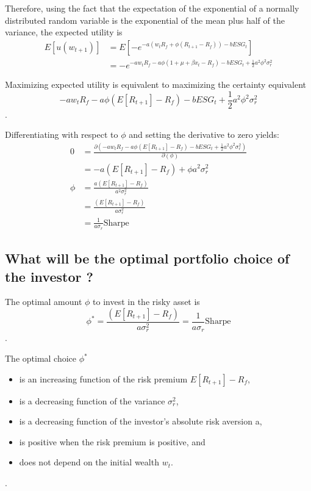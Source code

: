 \documentclass[]{article}
\begin{document}
Therefore, using the fact that the expectation of the exponential of a normally distributed random variable is the exponential of the mean plus half of the variance, the expected utility is
\begin{align*}
	E[u(w_{t+1})] &= E[-e^{-a(w_t R_f + \phi (R_{t+1} - R_f)) - bESG_t}]\\
	&= -e^{-aw_t R_f -a \phi (1+\mu+\beta x_t - R_f) - bESG_t + \frac{1}{2}a^2 \phi^2 \sigma_r^2}
\end{align*}

Maximizing expected utility is equivalent to maximizing the certainty equivalent $$-aw_t R_f -a \phi (E[R_{t+1}] - R_f) - bESG_t + \frac{1}{2}a^2 \phi^2 \sigma_r^2$$.

Differentiating with respect to $\phi$ and setting the derivative to zero yields: 
\begin{align*}
	0 &= \frac{\partial (-aw_t R_f -a \phi (E[R_{t+1}] - R_f) - bESG_t + \frac{1}{2}a^2 \phi^2 \sigma_r^2)}{\partial(\phi)}\\
	&= -a (E[R_{t+1}] - R_f) + \phi a^2 \sigma_r^2\\
	\phi &= \frac{a (E[R_{t+1}] - R_f)}{a^2 \sigma_r^2}\\
	&= \frac{(E[R_{t+1}] - R_f)}{a \sigma_r^2}\\
	&= \frac{1}{a \sigma_r}\text{Sharpe}
\end{align*}

\subsection{What will be the optimal portfolio choice of the investor ?}
The optimal amount $\phi$ to invest in the risky asset is $$\phi^* = \frac{(E[R_{t+1}] - R_f)}{a \sigma_r^2} = \frac{1}{a \sigma_r}\text{Sharpe}$$.

The optimal choice $\phi^*$ 
\begin{itemize}
	\item is an increasing function of the risk premium $E[R_{t+1}]-R_f$,
	\item is a decreasing function of the variance $\sigma_r^2$,
	\item is a decreasing function of the investor’s absolute risk aversion a,
	\item is positive when the risk premium is positive, and
	\item does not depend on the initial wealth $w_t$.
\end{itemize}.
\end{document}
